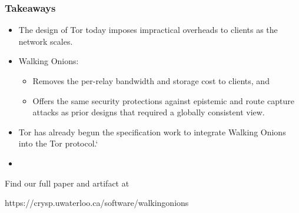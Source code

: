 \documentclass[hyperref={pdfpagelabels=true},table,dvipsnames,14pt,aspectratio=169]{beamer}
\begin{document}
\begin{frame}
\frametitle{Takeaways}
  \begin{itemize}
    \item<1-> The design of Tor today imposes impractical overheads to clients as
      the network scales.
    \item<2-> Walking Onions:
      \begin{itemize}
        \item<3-> Removes the per-relay bandwidth and storage cost to clients, and
        \item<4-> Offers the same security protections against epistemic
      and route capture attacks as prior designs that required a globally
      consistent view.
      \end{itemize}
    \item<5-> Tor has already begun the specification work to integrate
      Walking Onions into the Tor protocol.`
    \item[]~
  \end{itemize}
      \footnotesize{Find our full paper and artifact at

      https://crysp.uwaterloo.ca/software/walkingonions}
\end{frame}
\end{document}
